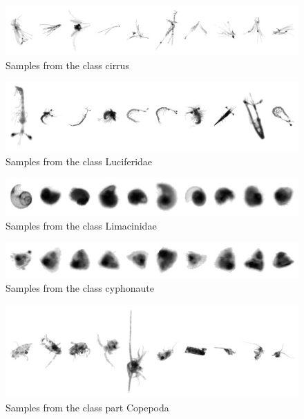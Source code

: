 \begin{figure}[h]
\includegraphics[width=\columnwidth]{collage/061_cirrus.jpg}\caption{Samples from the class cirrus }
\end{figure}
\begin{figure}[h]
\includegraphics[width=\columnwidth]{collage/062_Luciferidae.jpg}\caption{Samples from the class Luciferidae }
\end{figure}
\begin{figure}[h]
\includegraphics[width=\columnwidth]{collage/063_Limacinidae.jpg}\caption{Samples from the class Limacinidae }
\end{figure}
\begin{figure}[h]
\includegraphics[width=\columnwidth]{collage/064_cyphonaute.jpg}\caption{Samples from the class cyphonaute }
\end{figure}
\begin{figure}[h]
\includegraphics[width=\columnwidth]{collage/065_part__Copepoda.jpg}\caption{Samples from the class part  Copepoda }
\end{figure}
